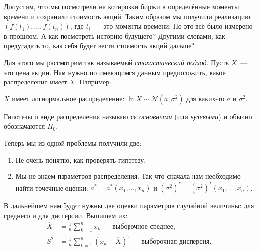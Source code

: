 Допустим, что мы посмотрели на котировки биржи в определённые моменты времени и 
сохранили стоимость акций. Таким образом мы получили реализацию \((f(t_{1}), 
\dots, f(t_{n}))\), где \(t_{i}\)~--- это моменты времени. Но это всё было 
измерено в прошлом. А как посмотреть историю будущего? Другими словами, как 
предугадать то, как себя будет вести стоимость акций дальше?

Для этого мы рассмотрим так называемый \emph{стохастический подход}. Пусть 
\(X\)~--- это цена акции. Нам нужно по имеющимся данным предположить, какое 
распределение имеет \(X\). Например:
\begin{hypothesis}
	\(X\) имеет логнормальное распределение: \(\ln X \sim \mathcal{N}(a, 
	\sigma^2)\) для каких-то \(a\) и \(\sigma^2\).
\end{hypothesis}

Гипотезы о виде распределения называются \emph{основными} (или 
\emph{нулевыми}) и обычно обозначаются \(H_{0}\).

Теперь мы из одной проблемы получили две:
\begin{enumerate}
	\item Не очень понятно, как проверять гипотезу.
	\item Мы не знаем параметров распределения. Так что сначала нам необходимо 
	найти точечные оценки: \(a^{*} = a^{*}(x_{1}, \dots, x_{n})\) и 
	\((\sigma^{2})^{*} = (\sigma^{2})^{*}(x_{1}, \dots, x_{n})\).
\end{enumerate}

В дальнейшем нам будут нужны две оценки параметров случайной величины: для 
среднего и для дисперсии. Выпишем их:
\begin{align*}
	\overline{X} &= \frac{1}{n}\sum_{k = 1}^{n} x_{k} \text{ --- выборочное 
	среднее,} \\
	S^2 &= \frac{1}{n}\sum_{k = 1}^{n} (x_{k} - \overline{X})^2 \text{ --- 
	выборочная дисперсия.}
\end{align*}